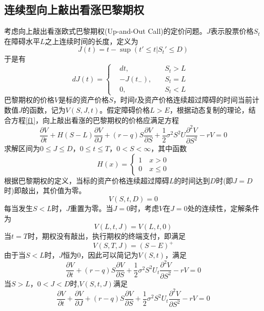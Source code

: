 \documentclass{ctexart} %
\begin{document}
\subsection{连续型向上敲出看涨巴黎期权}
考虑向上敲出看涨欧式巴黎期权(Up-and-Out Call)的定价问题。$J$表示股票价格$S_t$在障碍水平$L$之上连续时间的长度，定义为
\begin{equation}
J(t)=t-\sup(t'\leq t|S_t'\leq D)
\end{equation}
于是有
\begin{equation}
dJ(t)=\left\{
\begin{aligned}
&dt,\quad &S_t>L \\
&-J(t_-),\quad&S_t=L\\
&0,\quad&S_t<L&
\end{aligned}
\right.
\end{equation}
巴黎期权的价格$V$是标的资产价格$S$，时间$t$及资产价格连续超过障碍的时间当前计数值$J$的函数，记为$V(S,J,t)$。假定障碍价格$L>E$，根据动态复制的理论，结合方程\ref{f1}，向上敲出看涨的巴黎期权的价格应满足方程
\begin{equation}
\label{eq}
\frac{\partial V}{\partial t}+H(S-L)\frac{\partial V}{\partial J}+(r-q)S\frac{\partial V}{\partial S}+\frac{1}{2}\sigma^2S^2U\frac{\partial^2 V}{\partial S^2}-rV=0
\end{equation}
求解区间为$0\leq J \leq D$，$0\leq t \leq T$，$0< S < \infty$，其中函数
\begin{equation}
H(x)=\left\{
\begin{aligned}
1 \quad x>0 \\
0 \quad x\leq 0
\end{aligned}
\right.
\end{equation}
根据巴黎期权的定义，当标的资产价格连续超过障碍$L$的时间达到$D$时(即$J=D$时)即敲出，其价值为零。
\begin{equation}
V(S,t,D)=0
\end{equation}
每当发生$S<L$时，$J$重置为零。当$J=0$时，考虑$V$在$J=0$处的连续性，定解条件为
\begin{equation}
\label{bc1}
V(L,t,J)=V(L,t,0)
\end{equation}
当$t=T$时，期权没有敲出，执行期权的终端支付，即满足
\begin{equation}
V(S,T,J)=(S-E)^{+} 
\end{equation}
由于当$S<L$时，$J$恒为$0$，因此可以简记为$V(S,t)$，满足
\begin{equation}
\label{down}
\frac{\partial V}{\partial t}+(r-q)S\frac{\partial V}{\partial S}+\frac{1}{2}\sigma^2S^2U_t\frac{\partial^2 V}{\partial S^2}-rV=0
\end{equation}
当$S>L$，$0<J<D$时,$V(S,t,J)$满足
\begin{equation}
\label{up}
\frac{\partial V}{\partial t}+\frac{\partial V}{\partial J}+(r-q)S\frac{\partial V}{\partial S}+\frac{1}{2}\sigma^2S^2U_t\frac{\partial^2 V}{\partial S^2}-rV=0
\end{equation}
\end{document}
